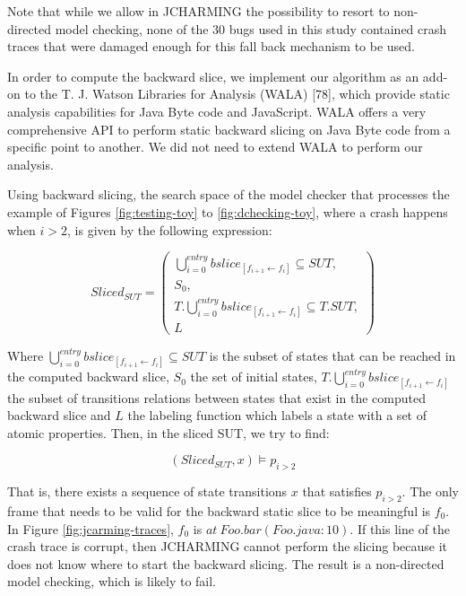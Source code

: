 \documentclass[12pt]{report}
\begin{document}
Note that while we allow in JCHARMING the possibility to resort to
non-directed model checking, none of the 30 bugs used in this study
contained crash traces that were damaged enough for this fall back
mechanism to be used.

In order to compute the backward slice, we implement our algorithm as an
add-on to the T. J. Watson Libraries for Analysis (WALA) {[}78{]}, which
provide static analysis capabilities for Java Byte code and JavaScript.
WALA offers a very comprehensive API to perform static backward slicing
on Java Byte code from a specific point to another. We did not need to
extend WALA to perform our analysis.

Using backward slicing, the search space of the model checker that
processes the example of Figures \ref{fig:testing-toy} to
\ref{fig:dchecking-toy}, where a crash happens when \(i>2\), is given by
the following expression:

\begin{equation}
Sliced_{SUT} =
\begin{pmatrix}
\bigcup_{i=0}^{entry} bslice_{[f_{i+1} \leftarrow f_i]} \subseteq SUT, \\
S_0, \\
T.\bigcup_{i=0}^{entry} bslice_{[f_{i+1} \leftarrow f_i]}  \subseteq T.SUT, \\
L
\end{pmatrix}
\end{equation}

Where
\(\bigcup_{i=0}^{entry} bslice_{[f_{i+1} \leftarrow f_i]} \subseteq SUT\)
is the subset of states that can be reached in the computed backward
slice, \(S_0\) the set of initial states,
\(T.\bigcup_{i=0}^{entry} bslice_{[f_{i+1} \leftarrow f_i]}\) the subset
of transitions relations between states that exist in the computed
backward slice and \(L\) the labeling function which labels a state with
a set of atomic properties. Then, in the sliced SUT, we try to find:

\begin{equation}
    (Sliced_{SUT}, x) \models p_{i>2}
\end{equation}

That is, there exists a sequence of state transitions \(x\) that
satisfies \(p_{i>2}\). The only frame that needs to be valid for the
backward static slice to be meaningful is \(f_0\). In Figure
\ref{fig:jcarming-traces}, \(f_0\) is \(at~Foo.bar(Foo.java:10)\). If
this line of the crash trace is corrupt, then JCHARMING cannot perform
the slicing because it does not know where to start the backward
slicing. The result is a non-directed model checking, which is likely to
fail.
\end{document}
